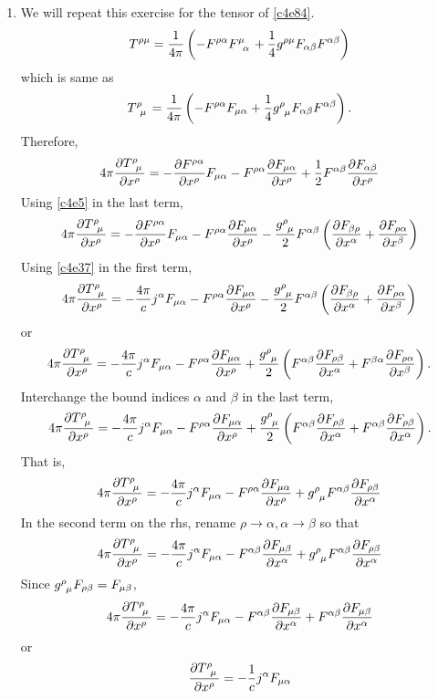 \begin{enumerate}
\item We will repeat this exercise for the tensor of \eqref{c4e84}.
\[
T^{\rho\mu} = \frac{1}{4\pi}\left(-F^{\rho\alpha}\tensor{F}{^\mu_\alpha} +
\frac{1}{4}g^{\rho\mu}F_{\alpha\beta}F^{\alpha\beta}\right)
\]
which is same as
\[
\tensor{T}{^\rho_\mu} = \frac{1}{4\pi}\left(-F^{\rho\alpha}F_{\mu\alpha} +
\frac{1}{4}\tensor{g}{^\rho_\mu}F_{\alpha\beta}F^{\alpha\beta}\right).
\]
Therefore,
\[
4\pi\pdt{\tensor{T}{^\rho_\mu}}{x^\rho} = -\pdt{F^{\rho\alpha}}{x^\rho}
F_{\mu\alpha} - F^{\rho\alpha}\pdt{F_{\mu\alpha}}{x^\rho} + 
\frac{1}{2}F^{\alpha\beta}\pdt{F_{\alpha\beta}}{x^\rho}
\]
Using \eqref{c4e5} in the last term,
\[
4\pi\pdt{\tensor{T}{^\rho_\mu}}{x^\rho} = -\pdt{F^{\rho\alpha}}{x^\rho}
F_{\mu\alpha}
- F^{\rho\alpha}\pdt{F_{\mu\alpha}}{x^\rho} - \frac{\tensor{g}{^\rho_\mu}}{2}
 F^{\alpha\beta}
 \left(\pdt{F_{\beta\rho}}{x^\alpha} + \pdt{F_{\rho\alpha}}{x^\beta}\right)
\]
Using \eqref{c4e37} in the first term,
\[
4\pi\pdt{\tensor{T}{^\rho_\mu}}{x^\rho} = -\frac{4\pi}{c}j^\alpha F_{\mu\alpha}
- F^{\rho\alpha}\pdt{F_{\mu\alpha}}{x^\rho} - \frac{\tensor{g}{^\rho_\mu}}{2}
F^{\alpha\beta}
\left(\pdt{F_{\beta\rho}}{x^\alpha} + \pdt{F_{\rho\alpha}}{x^\beta}\right)
\]
or
\[
4\pi\pdt{\tensor{T}{^\rho_\mu}}{x^\rho} = -\frac{4\pi}{c}j^\alpha F_{\mu\alpha}
- F^{\rho\alpha}\pdt{F_{\mu\alpha}}{x^\rho} + \frac{\tensor{g}{^\rho_\mu}}{2}
\left(F^{\alpha\beta}\pdt{F_{\rho\beta}}{x^\alpha} + F^{\beta\alpha}
\pdt{F_{\rho\alpha}}{x^\beta}\right).
\]
Interchange the bound indices $\alpha$ and $\beta$ in the last term,
\[
4\pi\pdt{\tensor{T}{^\rho_\mu}}{x^\rho} = -\frac{4\pi}{c}j^\alpha F_{\mu\alpha}
- F^{\rho\alpha}\pdt{F_{\mu\alpha}}{x^\rho} + \frac{\tensor{g}{^\rho_\mu}}{2}
\left(F^{\alpha\beta}\pdt{F_{\rho\beta}}{x^\alpha} + 
F^{\alpha\beta}\pdt{F_{\rho\beta}}{x^\alpha}\right).
\]
That is,
\[
4\pi\pdt{\tensor{T}{^\rho_\mu}}{x^\rho} = -\frac{4\pi}{c}j^\alpha F_{\mu\alpha}
- F^{\rho\alpha}\pdt{F_{\mu\alpha}}{x^\rho} + \tensor{g}{^\rho_\mu}
F^{\alpha\beta}\pdt{F_{\rho\beta}}{x^\alpha}
\]
In the second term on the rhs, rename $\rho \rightarrow \alpha, \alpha 
\rightarrow \beta$ so that
\[
4\pi\pdt{\tensor{T}{^\rho_\mu}}{x^\rho} = -\frac{4\pi}{c}j^\alpha F_{\mu\alpha}
- F^{\alpha\beta}\pdt{F_{\mu\beta}}{x^\alpha} + \tensor{g}{^\rho_\mu}
F^{\alpha\beta}\pdt{F_{\rho\beta}}{x^\alpha}
\]
Since $\tensor{g}{^\rho_\mu} F_{\rho\beta} = F_{\mu\beta}$,
\[
4\pi\pdt{\tensor{T}{^\rho_\mu}}{x^\rho} = -\frac{4\pi}{c}j^\alpha F_{\mu\alpha}
- F^{\alpha\beta}\pdt{F_{\mu\beta}}{x^\alpha} + F^{\alpha\beta}
\pdt{F_{\mu\beta}}{x^\alpha}
\]
or
\begin{equation}\label{c4e98}
\pdt{\tensor{T}{^\rho_\mu}}{x^\rho} = -\frac{1}{c}j^\alpha F_{\mu\alpha}
\end{equation}


\end{enumerate}
